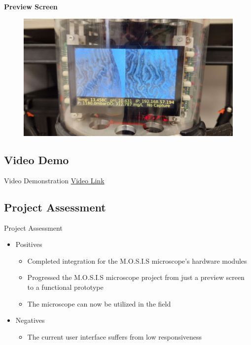 \documentclass[17pt, aspectratio=169]{beamer}
\begin{document}
\begin{frame}
	\textbf{Preview Screen}
	\begin{figure}
		\includegraphics[width=\textwidth, height=\textheight, keepaspectratio]{./Figures/PreviewScreen.jpg}	
	\end{figure}
\end{frame}
\subsection{Video Demo}
\begin{frame}{Video Demonstration}
	\href{https://youtu.be/JZFvu8QhQfI}{Video Link}
\end{frame}
\subsection{Project Assessment}
\begin{frame}{Project Assessment}
	\begin{itemize}
		\item Positives
		      \begin{itemize}
			      \item Completed integration for the M.O.S.I.S microscope's hardware modules
			      \item Progressed the M.O.S.I.S microscope project from just a preview screen to a functional prototype
			      \item The microscope can now be utilized in the field
		      \end{itemize}
		\item Negatives
		      \begin{itemize}
			      \item The current user interface suffers from low responsiveness
		      \end{itemize}
	\end{itemize}
\end{frame}
\end{document}
